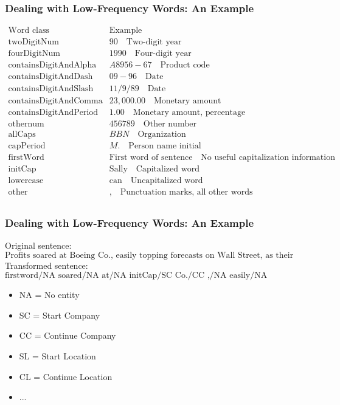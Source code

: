 \documentclass[handout]{beamer}
\begin{document}
\begin{frame}
  \frametitle{Dealing with Low-Frequency Words: An Example}
  \[
    \begin{array}{l|l}
      \text{Word class} & \text{Example} \\
      \hline
      \text{twoDigitNum} & 90 \quad \text{Two-digit year} \\
      \text{fourDigitNum} & 1990 \quad \text{Four-digit year} \\
      \text{containsDigitAndAlpha} & A8956-67 \quad \text{Product code} \\
      \text{containsDigitAndDash} & 09-96 \quad \text{Date} \\
      \text{containsDigitAndSlash} & 11/9/89 \quad \text{Date} \\
      \text{containsDigitAndComma} & 23,000.00 \quad \text{Monetary amount} \\
      \text{containsDigitAndPeriod} & 1.00 \quad \text{Monetary amount, percentage} \\
      \text{othernum} & 456789 \quad \text{Other number} \\
      \text{allCaps} & BBN \quad \text{Organization} \\
      \text{capPeriod} & M. \quad \text{Person name initial} \\
      \text{firstWord} & \text{First word of sentence} \quad \text{No useful capitalization information} \\
      \text{initCap} & \text{Sally} \quad \text{Capitalized word} \\
      \text{lowercase} & \text{can} \quad \text{Uncapitalized word} \\
      \text{other} & , \quad \text{Punctuation marks, all other words} \\
    \end{array}
  \]
\end{frame}

\begin{frame}
  \frametitle{Dealing with Low-Frequency Words: An Example}
  Original sentence:
  \[
    \text{Profits soared at Boeing Co., easily topping forecasts on Wall Street, as their CEO Alan Mulally announced first quarter results.}
  \]
  Transformed sentence:
  \[
    \text{firstword/NA soared/NA at/NA initCap/SC Co./CC ,/NA easily/NA lowercase/NA forecasts/NA on/NA initCap/SL Street/CL ,/NA as/NA their/NA CEO/NA Alan/SP initCap/CP announced/NA first/NA quarter/NA results/NA ./NA}
  \]
  \begin{itemize}
    \item NA = No entity
    \item SC = Start Company
    \item CC = Continue Company
    \item SL = Start Location
    \item CL = Continue Location
    \item ...
  \end{itemize}
\end{frame}
\end{document}
